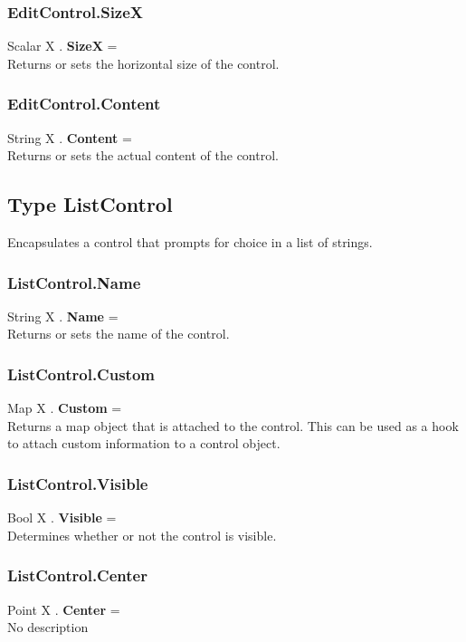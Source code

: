 \documentclass[10pt]{book}
\begin{document}
\subsubsection{EditControl.SizeX \label{F:EditControl:SizeX}}
Scalar X . \textbf{SizeX} = \\
Returns or sets the horizontal size of the control.

\subsubsection{EditControl.Content \label{F:EditControl:Content}}
String X . \textbf{Content} = \\
Returns or sets the actual content of the control.

\subsection{Type ListControl \label{T:ListControl}}
Encapsulates a control that prompts for choice in a list of strings.

\subsubsection{ListControl.Name \label{F:ListControl:Name}}
String X . \textbf{Name} = \\
Returns or sets the name of the control.

\subsubsection{ListControl.Custom \label{F:ListControl:Custom}}
Map X . \textbf{Custom} = \\
Returns a map object that is attached to the control. This can be used as a hook to attach custom information to a control object.

\subsubsection{ListControl.Visible \label{F:ListControl:Visible}}
Bool X . \textbf{Visible} = \\
Determines whether or not the control is visible.

\subsubsection{ListControl.Center \label{F:ListControl:Center}}
Point X . \textbf{Center} = \\
No description
\end{document}
